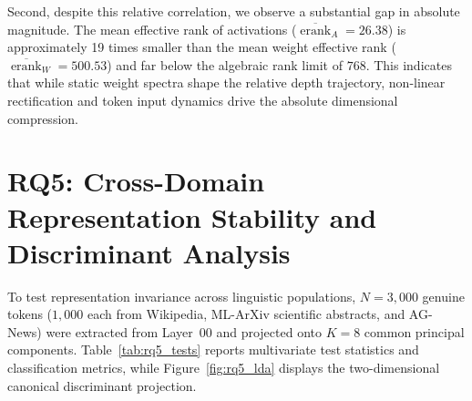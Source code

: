\documentclass[12pt, a4paper, oneside]{report}
\theoremstyle{definition}
\newcommand{\erank}{\operatorname{erank}}
\begin{document}
Second, despite this relative correlation, we observe a substantial gap in absolute magnitude. The mean effective rank of activations ($\overline{\erank}_A = 26.38$) is approximately 19 times smaller than the mean weight effective rank ($\overline{\erank}_W = 500.53$) and far below the algebraic rank limit of $768$. This indicates that while static weight spectra shape the relative depth trajectory, non-linear rectification and token input dynamics drive the absolute dimensional compression.

\section{RQ5: Cross-Domain Representation Stability and Discriminant Analysis}

To test representation invariance across linguistic populations, $N = 3{,}000$ genuine tokens ($1{,}000$ each from Wikipedia, ML-ArXiv scientific abstracts, and AG-News) were extracted from Layer~00 and projected onto $K = 8$ common principal components. Table~\ref{tab:rq5_tests} reports multivariate test statistics and classification metrics, while Figure~\ref{fig:rq5_lda} displays the two-dimensional canonical discriminant projection.
\end{document}
